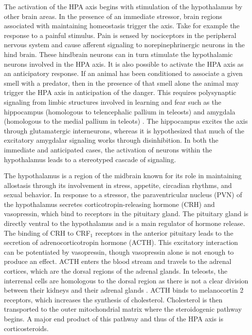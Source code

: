 \documentclass[12pt,twoside]{reedthesis}
\begin{document}
 The activation of the HPA
axis begins with stimulation of the hypothalamus by other 
brain areas. In the presence of an immediate stressor, brain regions associated with
maintaining homeostasis trigger the axis. Take for example the response to a
painful stimulus. Pain is sensed by nociceptors in the peripheral nervous system and cause afferent signaling to
norepinephrinergic neurons in the hind brain. These hindbrain neurons can in turn stimulate
the hypothalamic neurons involved in the HPA axis. It is also possible to activate the HPA axis as an
anticipatory response. If an animal has been conditioned to associate a given
smell with a predator, then in the presence of that smell
 alone the animal may trigger the HPA axis in anticipation of the danger. This requires polysynaptic signaling from limbic
structures involved in learning and fear such as the hippocampus (homologous to
telencephalic pallium in teleosts) and amygdala (homologous to the medial
pallium in teleots) \citep{salas_neuropsychology_2006}.
The hippocampus excites the axis through glutamatergic interneurons, whereas it is hypothesized that much of
the excitatory amygdalar signaling works through disinhibition. 
In both the immediate and anticipated cases, the activation of neurons within the hypothalamus leads to a
stereotyped cascade of signaling.

The hypothalamus is a region of the midbrain known
for its role in maintaining allostasis through its involvement in stress,
appetite, circadian rhythms, and sexual behavior. In response to a stressor, the
paraventricular nucleus (PVN) of the hypothalamus secretes
corticotropin-releasing hormone (CRH) and vasopressin, which bind to receptors
in the pituitary gland. The pituitary gland is directly ventral to the hypothalamus and is a main
regulator of hormone release. The binding of CRH to CRF$_{1}$ receptors in the
anterior pituitary leads to the secretion of adrenocorticotropin hormone (ACTH).
This excitatory interaction can be potentiated by vasopressin, though
vasopressin alone is not enough to produce an effect. ACTH enters the blood stream and travels to the adrenal cortices, which are the dorsal
regions of the adrenal glands. In teleosts, the interrenal cells are homologous
to the dorsal region as there is not a clear division
between their kidneys and their adrenal glands \citep{pijanowski_activity_2015}. ACTH binds to melanocortin 2 receptors, which
increases the synthesis of cholesterol. Cholesterol is then transported to the
outer mitochondrial matrix where the steroidogenic pathway begins. A major end
product of this pathway and thus of the HPA axis is corticosteroids.
\end{document}
